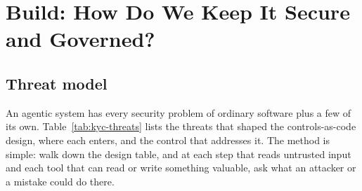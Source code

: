 
\section{Build: How Do We Keep It Secure and Governed?}
\label{sec:kyc-build}

\subsection{Threat model}

An agentic system has every security problem of ordinary software plus a few of its own. Table~\ref{tab:kyc-threats} lists the threats that shaped the controls-as-code design, where each enters, and the control that addresses it. The method is simple: walk down the design table, and at each step that reads untrusted input and each tool that can read or write something valuable, ask what an attacker or a mistake could do there.

